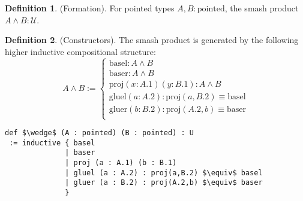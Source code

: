 \documentclass{article}
\theoremstyle{definition}
\newtheorem{definition}{Definition}
\begin{document}
\begin{definition} (Formation).
For pointed types \( A, B : \text{pointed} \), the smash product \( A \wedge B : \mathcal{U} \).
\end{definition}

\begin{definition} (Constructors).
The smash product is generated by the following higher inductive compositional structure:
\[
A \wedge B :=
\begin{cases}
\text{basel} : A \wedge B \\
\text{baser} : A \wedge B \\
\text{proj} (x: A.1) (y: B.1) : A \wedge B \\
\text{gluel} (a: A.2) : \text{proj}(a,B.2) \equiv \text{basel} \\
\text{gluer} (b: B.2) : \text{proj}(A.2,b) \equiv \text{baser} \\
\end{cases}
\]
\begin{lstlisting}[mathescape=true]
def $\wedge$ (A : pointed) (B : pointed) : U
 := inductive { basel
              | baser
              | proj (a : A.1) (b : B.1)
              | gluel (a : A.2) : proj(a,B.2) $\equiv$ basel
              | gluer (a : B.2) : proj(A.2,b) $\equiv$ baser
              }
\end{lstlisting}
\end{definition}
\end{document}
